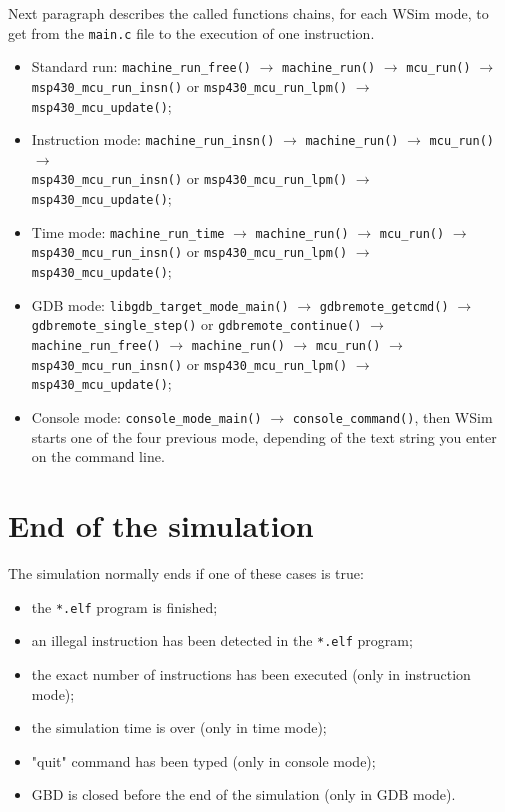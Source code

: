 \documentclass[a4paper,10pt]{report}
\begin{document}
Next paragraph describes the called functions chains, for each WSim mode, to get from the \verb$main.c$ file to the execution of one instruction.
\begin{itemize}
  \item Standard run: \verb$machine_run_free()$ $\longrightarrow$ \verb$machine_run()$ $\longrightarrow$ \verb$mcu_run()$ $\longrightarrow$ \verb$msp430_mcu_run_insn()$ or \verb$msp430_mcu_run_lpm()$ $\longrightarrow$ \verb$msp430_mcu_update()$;
  \item Instruction mode: \verb$machine_run_insn()$ $\longrightarrow$ \verb$machine_run()$ $\longrightarrow$ \verb$mcu_run()$ $\longrightarrow$ \\\verb$msp430_mcu_run_insn()$ or \verb$msp430_mcu_run_lpm()$ $\longrightarrow$ \verb$msp430_mcu_update()$;
  \item Time mode: \verb$machine_run_time$ $\longrightarrow$ \verb$machine_run()$ $\longrightarrow$ \verb$mcu_run()$ $\longrightarrow$ \verb$msp430_mcu_run_insn()$ or \verb$msp430_mcu_run_lpm()$ $\longrightarrow$ \verb$msp430_mcu_update()$;
  \item GDB mode: \verb$libgdb_target_mode_main()$ $\longrightarrow$ \verb$gdbremote_getcmd()$ $\longrightarrow$ \verb$gdbremote_single_step()$ or \verb$gdbremote_continue()$ $\longrightarrow$ \verb$machine_run_free()$ $\longrightarrow$ \verb$machine_run()$ $\longrightarrow$ \verb$mcu_run()$ $\longrightarrow$\\ \verb$msp430_mcu_run_insn()$ or \verb$msp430_mcu_run_lpm()$ $\longrightarrow$ \verb$msp430_mcu_update()$;
  \item Console mode: \verb$console_mode_main()$ $\longrightarrow$ \verb$console_command()$, then WSim starts one of the four previous mode, depending of the text string you enter on the command line.
\end{itemize}

\section{End of the simulation}
The simulation normally ends if one of these cases is true:
\begin{itemize}
  \item the \verb$*.elf$ program is finished;
  \item an illegal instruction has been detected in the \verb$*.elf$ program;
  \item the exact number of instructions has been executed (only in instruction mode);
  \item the simulation time is over (only in time mode);
  \item "quit" command has been typed (only in console mode);
  \item GBD is closed before the end of the simulation (only in GDB mode).
\end{itemize}
\end{document}
